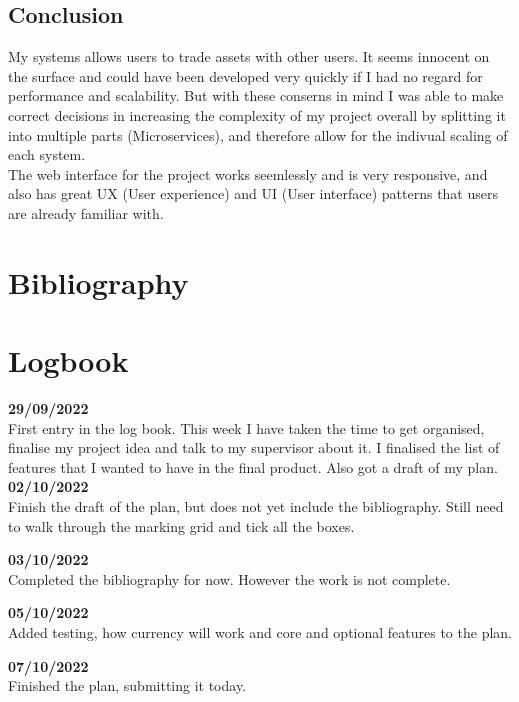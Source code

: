 \documentclass[titlepage]{article}
\begin{document}
\subsection{Conclusion}
My systems allows users to trade assets with other users. It seems innocent on the surface and could have been developed very quickly if I had no regard for performance and scalability. But with these conserns in mind I was able to make correct decisions in increasing the complexity of my project overall by splitting it into multiple parts (Microservices), and therefore allow for the indivual scaling of each system. \\

The web interface for the project works seemlessly and is very responsive, and also has great UX (User experience) and UI (User interface) patterns that users are already familiar with.

\section{Bibliography}




\pagebreak
\section{Logbook}

\textbf{29/09/2022} \\
First entry in the log book. This week I have taken the time to get organised, finalise my project idea and talk to my supervisor about it. I finalised the list of features that I wanted to have in the final product. Also got a draft of my plan.
\\

\noindent
\textbf{02/10/2022} \\
Finish the draft of the plan, but does not yet include the bibliography. Still need to walk through the marking grid and tick all the boxes.

\textbf{03/10/2022} \\
Completed the bibliography for now. However the work is not complete.

\textbf{05/10/2022} \\
Added testing, how currency will work and core and optional features to the plan.

\textbf{07/10/2022} \\
Finished the plan, submitting it today.
\end{document}
